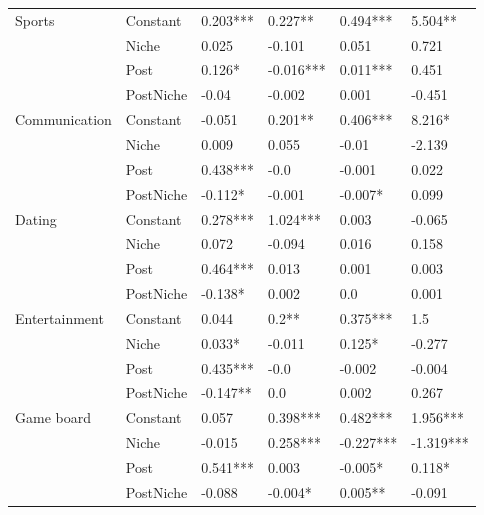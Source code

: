 \begin{longtable}[h!]{llllll}
\cline{1-6}
\multirow{4}{*}{Sports} & Constant &            0.203*** &     0.227** &   0.494*** &    5.504** \\
          & Niche &               0.025 &      -0.101 &      0.051 &      0.721 \\
          & Post &              0.126* &   -0.016*** &   0.011*** &      0.451 \\
          & PostNiche &               -0.04 &      -0.002 &      0.001 &     -0.451 \\
\cline{1-6}
\multirow{4}{*}{Communication} & Constant &              -0.051 &     0.201** &   0.406*** &     8.216* \\
          & Niche &               0.009 &       0.055 &      -0.01 &     -2.139 \\
          & Post &            0.438*** &        -0.0 &     -0.001 &      0.022 \\
          & PostNiche &             -0.112* &      -0.001 &    -0.007* &      0.099 \\
\cline{1-6}
\multirow{4}{*}{Dating} & Constant &            0.278*** &    1.024*** &      0.003 &     -0.065 \\
          & Niche &               0.072 &      -0.094 &      0.016 &      0.158 \\
          & Post &            0.464*** &       0.013 &      0.001 &      0.003 \\
          & PostNiche &             -0.138* &       0.002 &        0.0 &      0.001 \\
\cline{1-6}
\multirow{4}{*}{Entertainment} & Constant &               0.044 &       0.2** &   0.375*** &        1.5 \\
          & Niche &              0.033* &      -0.011 &     0.125* &     -0.277 \\
          & Post &            0.435*** &        -0.0 &     -0.002 &     -0.004 \\
          & PostNiche &            -0.147** &         0.0 &      0.002 &      0.267 \\
\cline{1-6}
\multirow{4}{*}{Game board} & Constant &               0.057 &    0.398*** &   0.482*** &   1.956*** \\
          & Niche &              -0.015 &    0.258*** &  -0.227*** &  -1.319*** \\
          & Post &            0.541*** &       0.003 &    -0.005* &     0.118* \\
          & PostNiche &              -0.088 &     -0.004* &    0.005** &     -0.091 \\

\end{longtable}
